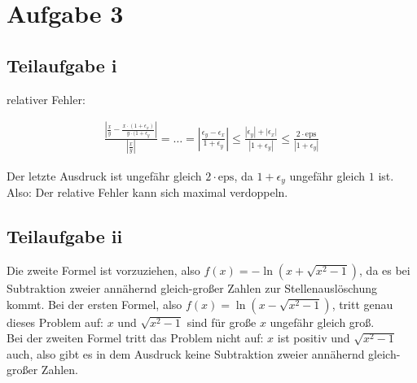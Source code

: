 \section*{Aufgabe 3}
\subsection*{Teilaufgabe i}
relativer Fehler:

\begin{align}
	\frac{ | \frac{x}{y} - \frac{x \cdot (1 + \epsilon_x)}{y \cdot (1 + \epsilon_y}|}{|\frac{x}{y}|}
	= \ldots = |\frac{\epsilon_y - \epsilon_x }{1 + \epsilon_y} |
	\le \frac{|\epsilon_y | + | \epsilon_x |}{|1 + \epsilon_y|} \le \frac{2 \cdot \text{eps}}{|1 + \epsilon_y|} 
\end{align}

Der letzte Ausdruck ist ungefähr gleich $2 \cdot \text{eps}$, da $1 + \epsilon_y$ ungefähr gleich $1$ ist.
Also: Der relative Fehler kann sich maximal verdoppeln.

\subsection*{Teilaufgabe ii}
Die zweite Formel ist vorzuziehen, also $f(x) = -\ln (x + \sqrt{x^2-1})$, da es bei Subtraktion zweier annähernd gleich-großer Zahlen zur Stellenauslöschung kommt. Bei der ersten Formel, also $f(x) = \ln (x - \sqrt{x^2-1})$, tritt genau dieses Problem auf: $x$ und $\sqrt{x^2-1}$ sind für große $x$ ungefähr gleich groß. \\
Bei der zweiten Formel tritt das Problem nicht auf: $x$ ist positiv und $\sqrt{x^2 - 1}$ auch, also gibt es in dem Ausdruck keine Subtraktion zweier annähernd gleich-großer Zahlen.

